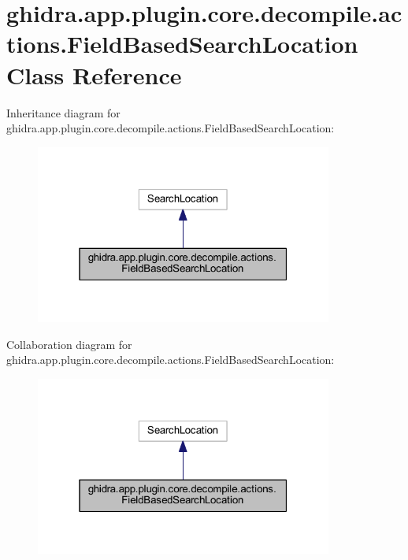 \hypertarget{classghidra_1_1app_1_1plugin_1_1core_1_1decompile_1_1actions_1_1_field_based_search_location}{}\section{ghidra.\+app.\+plugin.\+core.\+decompile.\+actions.\+Field\+Based\+Search\+Location Class Reference}
\label{classghidra_1_1app_1_1plugin_1_1core_1_1decompile_1_1actions_1_1_field_based_search_location}


Inheritance diagram for ghidra.\+app.\+plugin.\+core.\+decompile.\+actions.\+Field\+Based\+Search\+Location\+:
\nopagebreak
\begin{figure}[H]
\begin{center}
\leavevmode
\includegraphics[width=277pt]{classghidra_1_1app_1_1plugin_1_1core_1_1decompile_1_1actions_1_1_field_based_search_location__inherit__graph}
\end{center}
\end{figure}


Collaboration diagram for ghidra.\+app.\+plugin.\+core.\+decompile.\+actions.\+Field\+Based\+Search\+Location\+:
\nopagebreak
\begin{figure}[H]
\begin{center}
\leavevmode
\includegraphics[width=277pt]{classghidra_1_1app_1_1plugin_1_1core_1_1decompile_1_1actions_1_1_field_based_search_location__coll__graph}
\end{center}
\end{figure}
